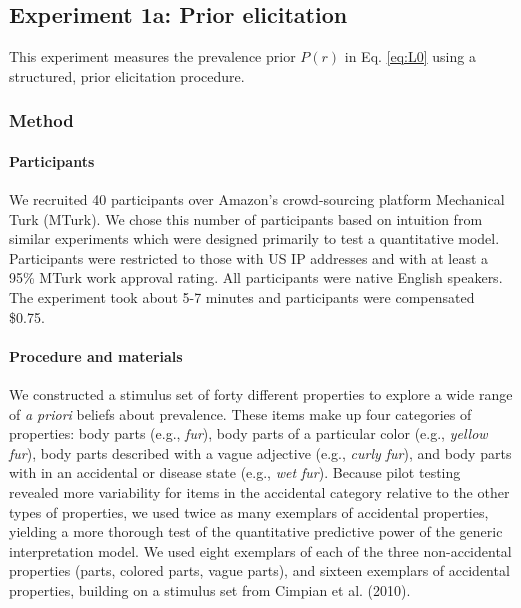 \documentclass[floatsintext,doc]{apa6}
\theoremstyle{definition}
\theoremstyle{definition}
\theoremstyle{definition}
\theoremstyle{remark}
\begin{document}
\subsection{Experiment 1a: Prior
elicitation}\label{experiment-1a-prior-elicitation}

This experiment measures the prevalence prior \(P(r)\) in Eq.
\ref{eq:L0} using a structured, prior elicitation procedure.

\subsubsection{Method}\label{method}

\paragraph{Participants}\label{participants}

We recruited 40 participants over Amazon's crowd-sourcing platform
Mechanical Turk (MTurk). We chose this number of participants based on
intuition from similar experiments which were designed primarily to test
a quantitative model. Participants were restricted to those with US IP
addresses and with at least a 95\% MTurk work approval rating. All
participants were native English speakers. The experiment took about 5-7
minutes and participants were compensated \$0.75.

\paragraph{Procedure and materials}\label{procedure-and-materials}

We constructed a stimulus set of forty different properties to explore a
wide range of \emph{a priori} beliefs about prevalence. These items make
up four categories of properties: body parts (e.g., \emph{fur}), body
parts of a particular color (e.g., \emph{yellow fur}), body parts
described with a vague adjective (e.g., \emph{curly fur}), and body
parts with in an accidental or disease state (e.g., \emph{wet fur}).
Because pilot testing revealed more variability for items in the
accidental category relative to the other types of properties, we used
twice as many exemplars of accidental properties, yielding a more
thorough test of the quantitative predictive power of the generic
interpretation model. We used eight exemplars of each of the three
non-accidental properties (parts, colored parts, vague parts), and
sixteen exemplars of accidental properties, building on a stimulus set
from Cimpian et al. (2010).
\end{document}
